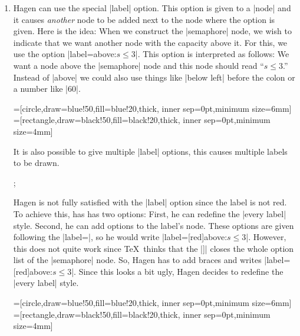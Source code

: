 \begin{enumerate}
\item Hagen can use the special |label| option. This option is given
  to a |node| and it causes \emph{another} node to be added next to
  the node where the option is given. Here is the idea: When we
  construct the |semaphore| node, we wish to indicate that we want
  another node with the capacity above it. For this, we use the option
  |label=above:$s\le 3$|. This option is interpreted as follows: We
  want a node above the |semaphore| node and this node should read
  ``$s \le 3$.'' Instead of |above| we could also use things like
  |below left| before the colon or a number like |60|. 
{
=[circle,draw=blue!50,fill=blue!20,thick,
                   inner sep=0pt,minimum size=6mm]
=[rectangle,draw=black!50,fill=black!20,thick,
                        inner sep=0pt,minimum size=4mm]
\begin{codeexample}[]
\end{codeexample}
}
  It is also possible to give multiple |label| options, this causes
  multiple labels to be drawn.
\begin{codeexample}[]
\tikz
  ;
\end{codeexample}
  Hagen is not fully satisfied with the |label| option since the label
  is not red. To achieve this, has has two options: First, he can
  redefine the |every label| style. Second, he can add options to the
  label's node. These options are given following the |label=|, so he
  would write |label=[red]above:$s\le3$|. However, this does not quite
  work since \TeX\ thinks that the |]| closes the whole option list of
  the |semaphore| node. So, Hagen has to add braces and writes
  |label={[red]above:$s\le3$}|. Since this looks a bit ugly, Hagen
  decides to redefine the |every label| style.
{
=[circle,draw=blue!50,fill=blue!20,thick,
                   inner sep=0pt,minimum size=6mm]
=[rectangle,draw=black!50,fill=black!20,thick,
                        inner sep=0pt,minimum size=4mm]
\begin{codeexample}[]
\end{codeexample}
}
\end{enumerate}
